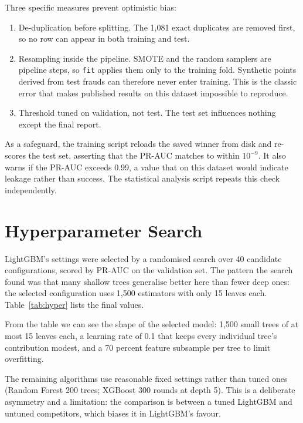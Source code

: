 Three specific measures prevent optimistic bias:

\begin{enumerate}
  \item De-duplication before splitting. The 1{,}081 exact duplicates are removed
        first, so no row can appear in both training and test.
  \item Resampling inside the pipeline. SMOTE and the random samplers are pipeline
        steps, so \texttt{fit} applies them only to the training fold. Synthetic points
        derived from test frauds can therefore never enter training. This is the classic
        error that makes published results on this dataset impossible to reproduce.
  \item Threshold tuned on validation, not test. The test set influences nothing
        except the final report.
\end{enumerate}

As a safeguard, the training script reloads the saved winner from disk and re-scores the
test set, asserting that the PR-AUC matches to within $10^{-9}$. It also warns if the
PR-AUC exceeds 0.99, a value that on this dataset would indicate leakage rather than
success. The statistical analysis script repeats this check independently.

\section{Hyperparameter Search}

LightGBM's settings were selected by a randomised search over 40 candidate configurations,
scored by PR-AUC on the validation set. The pattern the search found was that many shallow
trees generalise better here than fewer deep ones: the selected configuration uses 1{,}500
estimators with only 15 leaves each. Table~\ref{tab:hyper} lists the final values.

\begin{table}[htbp]
    \centering
    \caption{LightGBM hyperparameters.}
    \label{tab:hyper}
    \small
    
\end{table}

From the table we can see the shape of the selected model: 1{,}500 small trees of at most
15 leaves each, a learning rate of 0.1 that keeps every individual tree's contribution
modest, and a 70 percent feature subsample per tree to limit overfitting.

The remaining algorithms use reasonable fixed settings rather than tuned ones (Random
Forest 200 trees; XGBoost 300 rounds at depth 5). This is a deliberate asymmetry and a
limitation: the comparison is between a tuned LightGBM and untuned competitors, which
biases it in LightGBM's favour.

